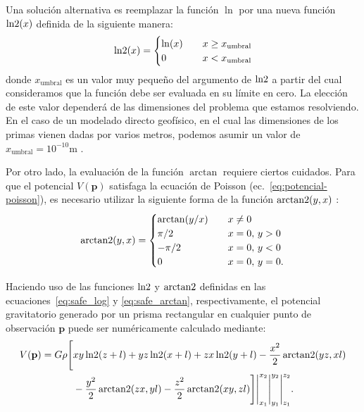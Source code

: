 Una solución alternativa es reemplazar la función $\ln$ por una nueva función
$\operatorname{ln2}(x)$ definida de la siguiente manera:
%
\begin{equation}
    \operatorname{ln2}(x) =
    \begin{cases}
        \ln(x) & \quad x \ge x_\text{umbral} \\
        0      & \quad x < x_\text{umbral}
    \end{cases}
    \label{eq:safe_log}
\end{equation}
%
donde $x_\text{umbral}$ es un valor muy pequeño del argumento de
$\operatorname{ln2}$ a partir del cual consideramos que la función debe ser evaluada en
su límite en cero.
La elección de este valor dependerá de las dimensiones del problema que estamos
resolviendo.
En el caso de un modelado directo geofísico, en el cual las dimensiones de los
primas vienen dadas por varios metros, podemos asumir un valor de
$x_\text{umbral} = 10^{-10}$m \citep{harmonica2021}.

Por otro lado, la evaluación de la función $\arctan$ requiere ciertos cuidados.
Para que el potencial $V(\mathbf{p})$ satisfaga la ecuación de Poisson
(ec.~\ref{eq:potencial-poisson}), es necesario utilizar la siguiente forma de
la función $\operatorname{arctan2}(y, x)$ \citep{fukushima2020}:
%
\begin{equation}
    \operatorname{arctan2}(y, x) =
    \begin{cases}
        \arctan(y / x) & \quad x \ne 0 \\
        \pi / 2        & \quad x = 0,\, y > 0 \\
        -\pi / 2       & \quad x = 0,\, y < 0 \\
        0              & \quad x = 0,\, y = 0.
    \end{cases}
    \label{eq:safe_arctan}
\end{equation}

Haciendo uso de las funciones $\operatorname{ln2}$ y $\operatorname{arctan2}$ definidas en las
ecuaciones~\ref{eq:safe_log} y \ref{eq:safe_arctan}, respectivamente, el
potencial gravitatorio generado por un prisma rectangular en cualquier punto de
observación $\mathbf{p}$ puede ser numéricamente calculado mediante:
%
\begin{equation}
    \begin{split}
        V(\mathbf{p}) =
        G \rho
        \Bigg[ &
            xy \operatorname{ln2} (z + l)
            + yz \operatorname{ln2}(x + l)
            + zx \operatorname{ln2}(y + l)
           - \frac{x^2}{2} \operatorname{arctan2}(yz, xl)
                \\&
           - \frac{y^2}{2} \operatorname{arctan2}(zx, yl)
           - \frac{z^2}{2} \operatorname{arctan2}(xy, zl)
        \Bigg]
        \Bigg|_{x_1}^{x_2}
        \Bigg|_{y_1}^{y_2}
        \Bigg|_{z_1}^{z_2}.
    \end{split}
    \label{eq:potencial-prismas-numerico}
\end{equation}


